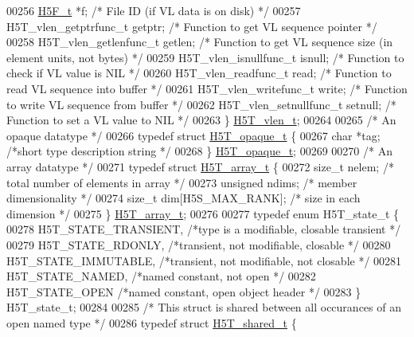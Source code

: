\begin{DoxyCode}
00256     \hyperlink{struct_h5_f__t}{H5F\_t} *f;                   \textcolor{comment}{/* File ID (if VL data is on disk) */}
00257     H5T\_vlen\_getptrfunc\_t getptr;   \textcolor{comment}{/* Function to get VL sequence pointer */}
00258     H5T\_vlen\_getlenfunc\_t getlen;   \textcolor{comment}{/* Function to get VL sequence size (in element units, not bytes) */}
00259     H5T\_vlen\_isnullfunc\_t isnull;   \textcolor{comment}{/* Function to check if VL value is NIL */}
00260     H5T\_vlen\_readfunc\_t read;   \textcolor{comment}{/* Function to read VL sequence into buffer */}
00261     H5T\_vlen\_writefunc\_t write; \textcolor{comment}{/* Function to write VL sequence from buffer */}
00262     H5T\_vlen\_setnullfunc\_t setnull; \textcolor{comment}{/* Function to set a VL value to NIL */}
00263 \} \hyperlink{struct_h5_t__vlen__t}{H5T\_vlen\_t};
00264 
00265 \textcolor{comment}{/* An opaque datatype */}
00266 \textcolor{keyword}{typedef} \textcolor{keyword}{struct }\hyperlink{struct_h5_t__opaque__t}{H5T\_opaque\_t} \{
00267     \textcolor{keywordtype}{char}        *tag;       \textcolor{comment}{/*short type description string      */}
00268 \} \hyperlink{struct_h5_t__opaque__t}{H5T\_opaque\_t};
00269 
00270 \textcolor{comment}{/* An array datatype */}
00271 \textcolor{keyword}{typedef} \textcolor{keyword}{struct }\hyperlink{struct_h5_t__array__t}{H5T\_array\_t} \{
00272     \textcolor{keywordtype}{size\_t}  nelem;      \textcolor{comment}{/* total number of elements in array */}
00273     \textcolor{keywordtype}{unsigned}    ndims;      \textcolor{comment}{/* member dimensionality        */}
00274     \textcolor{keywordtype}{size\_t}  dim[H5S\_MAX\_RANK];  \textcolor{comment}{/* size in each dimension       */}
00275 \} \hyperlink{struct_h5_t__array__t}{H5T\_array\_t};
00276 
00277 \textcolor{keyword}{typedef} \textcolor{keyword}{enum} H5T\_state\_t \{
00278     H5T\_STATE\_TRANSIENT,        \textcolor{comment}{/*type is a modifiable, closable transient */}
00279     H5T\_STATE\_RDONLY,           \textcolor{comment}{/*transient, not modifiable, closable */}
00280     H5T\_STATE\_IMMUTABLE,        \textcolor{comment}{/*transient, not modifiable, not closable */}
00281     H5T\_STATE\_NAMED,            \textcolor{comment}{/*named constant, not open       */}
00282     H5T\_STATE\_OPEN          \textcolor{comment}{/*named constant, open object header */}
00283 \} H5T\_state\_t;
00284 
00285     \textcolor{comment}{/* This struct is shared between all occurances of an open named type */}
00286 \textcolor{keyword}{typedef} \textcolor{keyword}{struct }\hyperlink{struct_h5_t__shared__t}{H5T\_shared\_t} \{

\end{DoxyCode}
